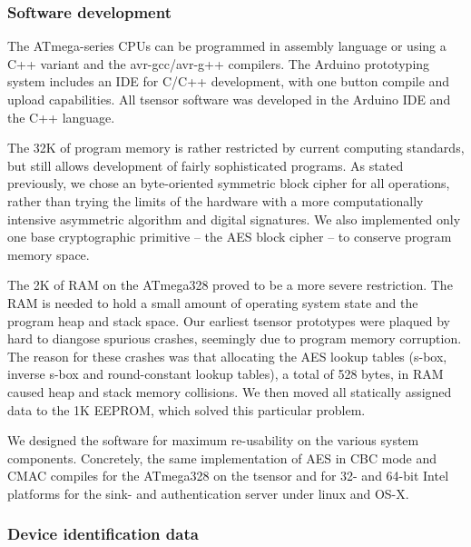 \subsubsection{Software development} 

The ATmega-series CPUs can be programmed in assembly language or using a C++ variant and the avr-gcc/avr-g++ compilers. The Arduino prototyping system includes an IDE for C/C++ development, with one button compile and upload capabilities. All tsensor software was developed in the Arduino IDE and the C++ language.

The 32K of program memory is rather restricted by current computing standards, but still allows development of fairly sophisticated programs. As stated previously, we chose an byte-oriented symmetric block cipher for all operations, rather than trying the limits of the hardware with a more computationally intensive asymmetric algorithm and digital signatures. We also implemented only one base cryptographic primitive -- the AES block cipher -- to conserve program memory space.

The 2K of RAM on the ATmega328 proved to be a more severe restriction. The RAM is needed to hold a small amount of operating system state and the program heap and stack space. Our earliest tsensor prototypes were plaqued by hard to diangose spurious crashes, seemingly due to program memory corruption. The reason for these crashes was that allocating the AES lookup tables (s-box, inverse s-box and round-constant lookup tables), a total of 528 bytes, in RAM caused heap and stack memory collisions. We then moved all statically assigned data to the 1K EEPROM, which solved this particular problem.

We designed the software for maximum re-usability on the various system components. Concretely, the same implementation of AES in CBC mode and CMAC compiles for the ATmega328 on the tsensor and for 32- and 64-bit Intel platforms for the sink- and authentication server under linux and OS-X.

\subsubsection{Device identification data}

